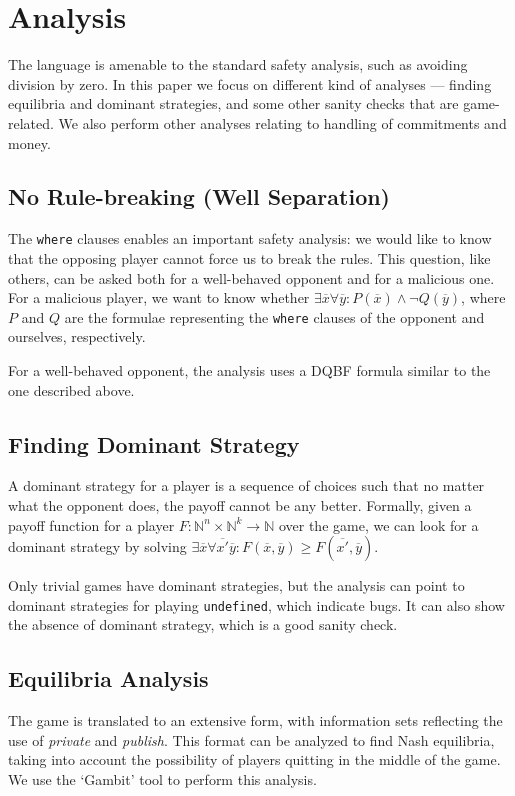 \documentclass[acmsmall,review,anonymous]{acmart}\settopmatter{printfolios=true,printccs=false,printacmref=false}
\begin{document}
\section{Analysis}
The language is amenable to the standard safety analysis, such as avoiding division by zero. In this paper we focus on different kind of analyses --- finding equilibria and dominant strategies, and some other sanity checks that are game-related. We also perform other analyses relating to handling of commitments and money.

\subsection{No Rule-breaking (Well Separation)}
The \texttt{where} clauses enables an important safety analysis: we would like to know that the opposing player cannot force us to break the rules. This question, like others, can be asked both for a well-behaved opponent and for a malicious one. For a malicious player, we want to know whether $\exists \overline{x} \forall \overline{y}: P(\overline{x})\wedge \neg Q(\overline{y})$, where $P$ and $Q$ are the formulae representing the \texttt{where} clauses of the opponent and ourselves, respectively.

For a well-behaved opponent, the analysis uses a DQBF formula similar to the one described above.

\subsection{Finding Dominant Strategy}
A dominant strategy for a player is a sequence of choices such that no matter what the opponent does, the payoff cannot be any better. Formally, given a payoff function for a player 
$F : \mathbb{N}^n \times \mathbb{N}^k \rightarrow \mathbb{N}$ 
over the game, we can look for a dominant strategy by solving
$\exists \overline{x} \forall \overline{x'} \overline{y}: F(\overline{x}, \overline{y})\geq F(\overline{x'}, \overline{y})$.

Only trivial games have dominant strategies, but the analysis can point to dominant strategies for playing \texttt{undefined}, which indicate bugs. It can also show the absence of dominant strategy, which is a good sanity check.

\subsection{Equilibria Analysis}
The game is translated to an extensive form, with information sets reflecting the use of \emph{private} and \emph{publish}. 
This format can be analyzed to find Nash equilibria, taking into account the possibility of players quitting in the middle of the game. We use the `Gambit' tool to perform this analysis.
\end{document}
